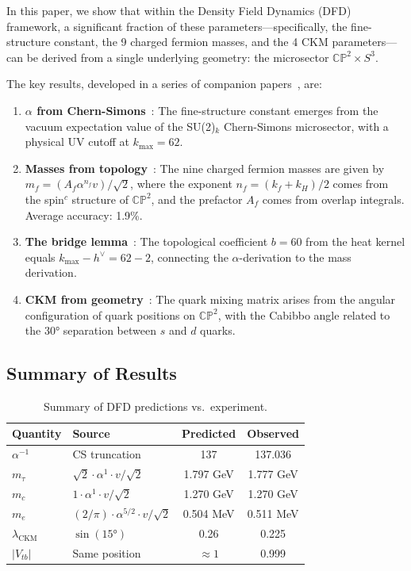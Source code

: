 \documentclass[11pt,a4paper]{article}
\newcommand{\CP}{\mathbb{CP}}
\begin{document}
In this paper, we show that within the Density Field Dynamics (DFD) framework, a significant fraction of these parameters---specifically, the fine-structure constant, the 9 charged fermion masses, and the 4 CKM parameters---can be derived from a single underlying geometry: the microsector $\CP^2 \times S^3$.

The key results, developed in a series of companion papers~\cite{DFD_Alpha,DFD_Masses,DFD_Bridge,DFD_CKM}, are:

\begin{enumerate}
\item \textbf{$\alpha$ from Chern-Simons}~\cite{DFD_Alpha}: The fine-structure constant emerges from the vacuum expectation value of the SU(2)$_k$ Chern-Simons microsector, with a physical UV cutoff at $k_{\max} = 62$.

\item \textbf{Masses from topology}~\cite{DFD_Masses}: The nine charged fermion masses are given by $m_f = (A_f \alpha^{n_f} v)/\sqrt{2}$, where the exponent $n_f = (k_f + k_H)/2$ comes from the spin$^c$ structure of $\CP^2$, and the prefactor $A_f$ comes from overlap integrals. Average accuracy: 1.9\%.

\item \textbf{The bridge lemma}~\cite{DFD_Bridge}: The topological coefficient $b = 60$ from the heat kernel equals $k_{\max} - h^\vee = 62 - 2$, connecting the $\alpha$-derivation to the mass derivation.

\item \textbf{CKM from geometry}~\cite{DFD_CKM}: The quark mixing matrix arises from the angular configuration of quark positions on $\CP^2$, with the Cabibbo angle related to the 30° separation between $s$ and $d$ quarks.
\end{enumerate}

\subsection{Summary of Results}

\begin{table}[h]
\centering
\begin{tabular}{llcc}
\toprule
Quantity & Source & Predicted & Observed \\
\midrule
$\alpha^{-1}$ & CS truncation & 137 & 137.036 \\
$m_\tau$ & $\sqrt{2} \cdot \alpha^1 \cdot v/\sqrt{2}$ & 1.797 GeV & 1.777 GeV \\
$m_c$ & $1 \cdot \alpha^1 \cdot v/\sqrt{2}$ & 1.270 GeV & 1.270 GeV \\
$m_e$ & $(2/\pi) \cdot \alpha^{5/2} \cdot v/\sqrt{2}$ & 0.504 MeV & 0.511 MeV \\
$\lambda_{\text{CKM}}$ & $\sin(15°)$ & 0.26 & 0.225 \\
$|V_{tb}|$ & Same position & $\approx 1$ & 0.999 \\
\bottomrule
\end{tabular}
\caption{Summary of DFD predictions vs.\ experiment.}
\end{table}
\end{document}
